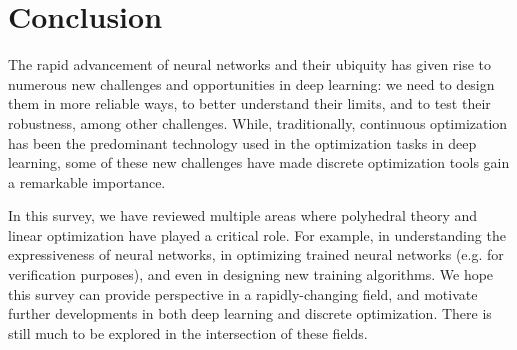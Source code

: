 
\section{Conclusion}

The rapid advancement of neural networks and their ubiquity has given rise to numerous new challenges and opportunities in deep learning: we need to design them in more reliable ways, to better understand their limits, and to test their robustness, among other challenges.
%
While, traditionally, continuous optimization has been the predominant technology used in the optimization tasks in deep learning, some of these new challenges have made discrete optimization tools gain a remarkable importance.

In this survey, we have reviewed multiple areas where polyhedral theory and linear optimization have played a critical role. For example, in understanding the expressiveness of neural networks, in optimizing trained neural networks (e.g. for verification purposes), and even in designing new training algorithms. 
%
We hope this survey can provide perspective in a rapidly-changing field, and motivate further developments in both deep learning and discrete optimization. There is still much to be explored in the intersection of these fields.
